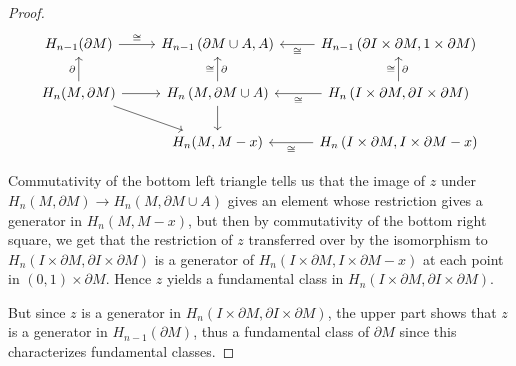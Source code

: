 \documentclass[reqno]{amsart}
\theoremstyle{definition}
\theoremstyle{remark}
\begin{document}
\begin{proof}
    \begin{equation*}
    \begin{tikzcd}
        H_{n-1}(\partial M) \ar[r, "\cong"] &
        H_{n-1}\left( \partial M \cup A, A \right) &
        H_{n-1}\left( \partial I \times \partial M,
        1 \times \partial M \right) \ar[l, "\cong"] \\
        H_n (M, \partial M) \ar[r] \ar[u, "\partial"]
        \ar[dr]&
        H_n \left( M, \partial M \cup  A \right) 
        \ar[u, "\cong", "\partial"'] 
        \ar[d]&
        H_n \left( I \times \partial M , \partial I 
        \times \partial M\right) \ar[l, "\cong"] 
        \ar[u, "\cong", "\partial"'] \\
        & H_n (M, M-x) & H_n \left( I \times \partial M,
        I \times \partial M - x \right) 
        \ar[l, "\cong"]
    \end{tikzcd}
    \end{equation*}

    Commutativity of the bottom left triangle tells us that
    the image of $z$ under 
    $H_n \left( M, \partial M \right) 
    \to H_n \left( M, \partial M \cup A \right) $ 
    gives an element whose restriction
    gives a generator in $H_n \left( M, M - x \right) $, but
    then by commutativity of the bottom right square,
    we get that the restriction of $z$ transferred over
    by the isomorphism to
    $H_n \left( I \times \partial M, \partial I \times 
    \partial M \right) $ is a generator of
    $H_n \left( I \times \partial M, I \times \partial M
    - x\right) $ at each point in $(0,1) \times \partial M$. Hence
    $z$ yields a fundamental class
    in $H_n \left( I \times \partial M,
    \partial I \times \partial M \right) $.

    But since $z$ is a generator in
    $H_n \left( I \times \partial M, \partial I \times 
    \partial M\right) $, the upper part shows that
    $z$ is a generator in
    $H_{n-1}(\partial M)$, thus a fundamental class
    of $\partial M$ since this characterizes fundamental classes.

\end{proof}
\end{document}
